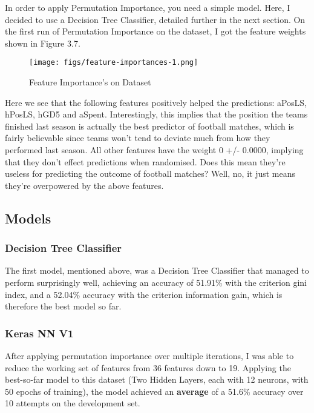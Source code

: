 \documentclass[12pt,a4paper,twoside,openright]{report}
\begin{document}
In order to apply Permutation Importance, you need a simple model. Here, I decided to use a Decision Tree Classifier, detailed further in the next section. On the first run of Permutation Importance on the dataset, I got the feature weights shown in Figure 3.7.

\begin{figure}[h]
  \centering
  \texttt{[image: figs/feature-importances-1.png]}
  \caption{Feature Importance's on Dataset}
  \label{fig:feature-importances-1}
\end{figure}

Here we see that the following features positively helped the predictions: aPosLS, hPosLS, hGD5 and aSpent. Interestingly, this implies that the position the teams finished last season is actually the best predictor of football matches, which is fairly believable since teams won't tend to deviate much from how they performed last season. All other features have the weight 0 +/- 0.0000, implying that they don't effect predictions when randomised. Does this mean they're useless for predicting the outcome of football matches? Well, no, it just means they're overpowered by the above features.

\subsection{Models}

\subsubsection{Decision Tree Classifier}

The first model, mentioned above, was a Decision Tree Classifier that managed to perform surprisingly well, achieving an accuracy of 51.91\% with the criterion gini index, and a 52.04\% accuracy with the criterion information gain, which is therefore the best model so far.

\subsubsection{Keras NN V1}

After applying permutation importance over multiple iterations, I was able to reduce the working set of features from 36 features down to 19. Applying the best-so-far model to this dataset (Two Hidden Layers, each with 12 neurons, with 50 epochs of training), the model achieved an \textbf{average} of a 51.6\% accuracy over 10 attempts on the development set.
\end{document}
